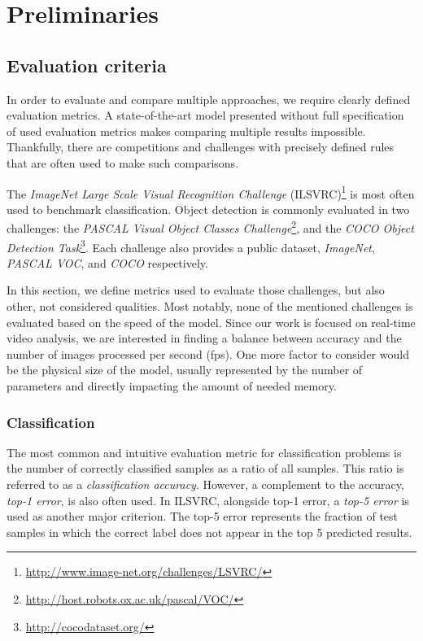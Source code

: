 \chapter{Preliminaries}
\label{chap:prelim}

\section{Evaluation criteria}
In order to evaluate and compare multiple approaches, we require clearly defined evaluation metrics. A state-of-the-art model presented without full specification of used evaluation metrics makes comparing multiple results impossible. Thankfully, there are competitions and challenges with precisely defined rules that are often used to make such comparisons. 

The \textit{ImageNet Large Scale Visual Recognition Challenge }(ILSVRC)\footnote{\url{http://www.image-net.org/challenges/LSVRC/}} is most often used to benchmark classification. Object detection is commonly evaluated in two challenges: the \textit{PASCAL Visual Object Classes Challenge}\footnote{\url{http://host.robots.ox.ac.uk/pascal/VOC/}}, and the \textit{COCO Object Detection Task}\footnote{\url{http://cocodataset.org/}}. Each challenge also provides a public dataset, \textit{ImageNet}, \textit{PASCAL VOC}, and \textit{COCO} respectively.

In this section, we define metrics used to evaluate those challenges, but also other, not considered qualities. Most notably, none of the mentioned challenges is evaluated based on the speed of the model. Since our work is focused on real-time video analysis, we are interested in finding a balance between accuracy and the number of images processed per second (fps). One more factor to consider would be the physical size of the model, usually represented by the number of parameters and directly impacting the amount of needed memory.

\subsection{Classification}
The most common and intuitive evaluation metric for classification problems is the number of correctly classified samples as a ratio of all samples. This ratio is referred to as a \textit{classification accuracy}. However, a complement to the accuracy, \textit{top-1 error}, is also often used. In ILSVRC,  alongside top-1 error, a \textit{top-5 error} is used as another major criterion. The top-5 error represents the fraction of test samples in which the correct label does not appear in the top 5 predicted results.

